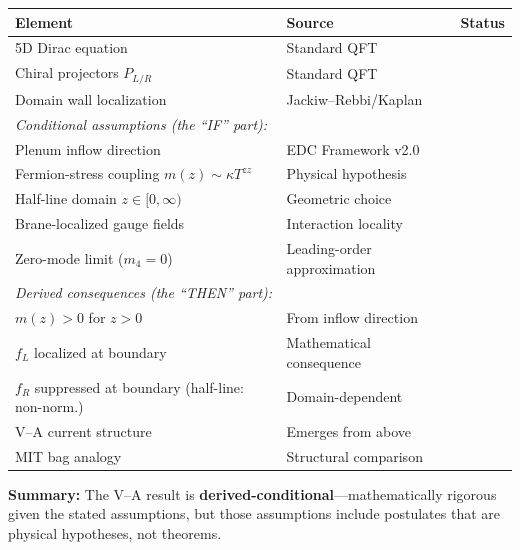 \begin{tcolorbox}[colback=green!5, colframe=green!50!black,
    title=\textbf{Epistemic Audit}]
\begin{center}
\small
\begin{tabular}{lll}
\toprule
\textbf{Element} & \textbf{Source} & \textbf{Status} \\
\midrule
5D Dirac equation & Standard QFT & \tagBL{} \\
Chiral projectors $P_{L/R}$ & Standard QFT & \tagBL{} \\
Domain wall localization & Jackiw--Rebbi/Kaplan & \tagBL{} \\
\midrule
\multicolumn{3}{l}{\textit{Conditional assumptions (the ``IF'' part):}} \\
Plenum inflow direction & EDC Framework v2.0 & \tagP{} \\
Fermion-stress coupling $m(z) \sim \kappa T^{zz}$ & Physical hypothesis & \tagP{} \\
Half-line domain $z \in [0, \infty)$ & Geometric choice & \tagP{} \\
Brane-localized gauge fields & Interaction locality & \tagP{} \\
Zero-mode limit ($m_4 = 0$) & Leading-order approximation & \tagP{} \\
\midrule
\multicolumn{3}{l}{\textit{Derived consequences (the ``THEN'' part):}} \\
$m(z) > 0$ for $z > 0$ & From inflow direction & \tagDc{} \\
$f_L$ localized at boundary & Mathematical consequence & \tagDc{} \\
$f_R$ suppressed at boundary (half-line: non-norm.) & Domain-dependent & \tagDc{} \\
V–A current structure & Emerges from above & \tagDc{} \\
\midrule
MIT bag analogy & Structural comparison & \tagI{} \\
\bottomrule
\end{tabular}
\end{center}
\medskip
\noindent\textbf{Summary:} The V--A result is \textbf{derived-conditional}---mathematically
rigorous given the stated assumptions, but those assumptions include postulates \tagP{}
that are physical hypotheses, not theorems.
\end{tcolorbox}

